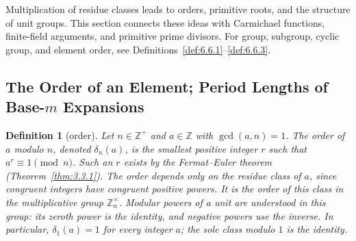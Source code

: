 \documentclass[11pt]{article}
\theoremstyle{ntstyle}
\newtheorem{definition}{Definition}[subsection]
\newcommand{\ZmodUnits}[1]{\mathbb{Z}_{#1}^{\times}}
\begin{document}
Multiplication of residue classes leads to orders, primitive roots, and the structure of unit groups. This section
connects these ideas with Carmichael functions, finite-field arguments, and primitive prime divisors. For group,
subgroup, cyclic group, and element order, see Definitions~\ref{def:6.6.1}--\ref{def:6.6.3}.


\subsection{The Order of an Element; Period Lengths of Base-\texorpdfstring{$m$}{m} Expansions}\label{subsec:6.1}

\begin{definition}[order]\label{def:6.1.1}\label{def:order} Let $n\in\mathbb{Z}^+$ and
  $a\in\mathbb{Z}$ with $\gcd(a,n)=1$. The order of $a$ modulo $n$,
  denoted $\delta_n(a)$, is the smallest positive integer $r$ such that
  $a^r\equiv1\pmod{n}$. Such an $r$ exists by the Fermat--Euler theorem
  (Theorem~\ref{thm:3.3.1}). The order depends only on the residue class of
  $a$, since congruent integers have congruent positive powers.
  It is the order of this class in the multiplicative group $\ZmodUnits{n}$.
  Modular powers of a unit are understood in this group: its zeroth power
  is the identity, and negative powers use the inverse. In particular,
  $\delta_1(a)=1$ for every integer $a$; the sole class modulo $1$ is the identity.

\end{definition}
\end{document}
